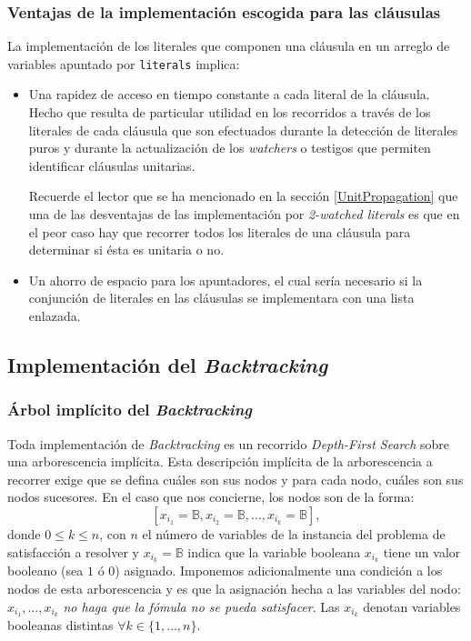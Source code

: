 \documentclass[12pt,lettersize,oneside]{article}
\begin{document}
\subsubsection{Ventajas de la implementación escogida para las cláusulas}
La implementación de los literales que componen una cláusula en un arreglo de
variables apuntado por {\tt literals} implica: \vspace{-2.5mm}
\begin{itemize}
\item Una rapidez de acceso en tiempo constante a cada literal de la
  cláusula. Hecho que resulta de particular utilidad en los recorridos a través
  de los literales de cada cláusula que son efectuados durante la detección de
  literales puros y durante la actualización de los \emph{watchers} o testigos
  que permiten identificar cláusulas unitarias. 

  Recuerde el lector que se ha mencionado en la sección \ref{UnitPropagation} que
  una de las desventajas de las implementación por \emph{2-watched literals} es
  que en el peor caso hay que recorrer todos los literales de una cláusula para
  determinar si ésta es unitaria o no.

\item Un ahorro de espacio para los apuntadores, el cual sería necesario si la
  conjunción de literales en las cláusulas se implementara con una lista
  enlazada.
\end{itemize}


\subsection{Implementación del \emph{Backtracking}}
\subsubsection{\'Arbol implícito del \emph{Backtracking}}\label{backtracking}
Toda implementación de \emph{Backtracking} es un recorrido \emph{Depth-First
  Search} sobre una arborescencia implícita. Esta descripción implícita de la
arborescencia a recorrer exige que se defina cuáles son sus nodos y para cada
nodo, cuáles son sus nodos sucesores. En el caso que nos concierne, los nodos
son de la forma:
\[[x_{i_1}=\mathbb{B},x_{i_2}=\mathbb{B},\ldots, x_{i_k} = \mathbb{B} ], \]
donde $0\leq k \leq n$, con $n$ el número de variables de la instancia del
problema de satisfacción a resolver y $x_{i_k}=\mathbb{B}$ indica que la
variable booleana $x_{i_k}$ tiene un valor booleano (sea $1$ ó $0$)
asignado. Imponemos adicionalmente una condición a los nodos de esta
arborescencia y es que la asignación hecha a las variables del nodo:
$x_{i_1},\ldots,x_{i_k}$ \emph{no haga que la fómula no se pueda
  satisfacer}. Las $x_{i_k}$ denotan variables booleanas distintas $\forall k
\in \{1,\ldots,n\}$.
\end{document}
